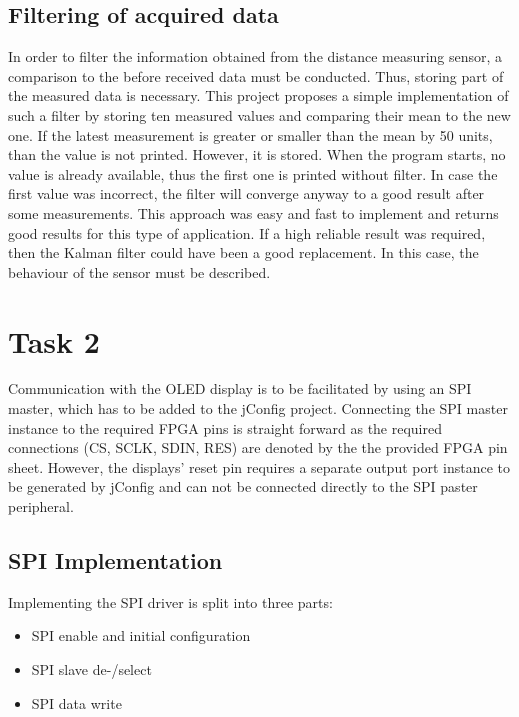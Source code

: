 		\subsection{Filtering of acquired data} %
		\label{sub:filter}
			In order to filter the information obtained from the distance measuring sensor, a comparison to the before received data must be conducted. Thus, storing part of the measured data is necessary.
			This project proposes a simple implementation of such a filter by storing ten measured values and comparing their mean to the new one. If the latest measurement is greater or smaller than the mean by 50 units, than the value is not printed. However, it is stored. When the program starts, no value is already available, thus the first one is printed without filter. In case the first value was incorrect, the filter will converge anyway to a good result after some measurements.
			This approach was easy and fast to implement and returns good results for this type of application. If a high reliable result was required, then the Kalman filter could have been a good replacement. In this case, the behaviour of the sensor must be described.

	\section{Task 2} %
	\label{sec:impl_task_2}
		Communication with the OLED display is to be facilitated by using an SPI master, which has to be added to the jConfig project. Connecting the SPI master instance to the required FPGA pins is straight forward as the required connections (CS, SCLK, SDIN, RES) are denoted by the the provided FPGA pin sheet. However, the displays' reset pin requires a separate output port instance to be generated by jConfig and can not be connected directly to the SPI paster peripheral. 

		\subsection{SPI Implementation} %
		\label{sub:impl_spi_implementation}
			Implementing the SPI driver is split into three parts:

			\begin{itemize}
				\item SPI enable and initial configuration
				\item SPI slave de-/select
				\item SPI data write
	   		\end{itemize}

